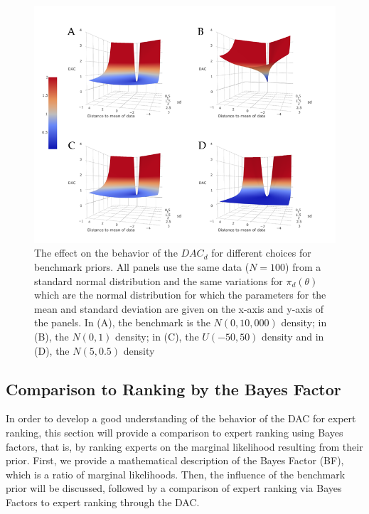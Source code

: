 \documentclass[openright,titlepage,12pt,a4paper]{book}
\begin{document}
\begin{figure}

{\centering \includegraphics[width=0.9\linewidth]{figures/chapter_3/Figure4} 

}

\caption{The effect on the behavior of the $DAC_d$ for different choices for benchmark priors. All panels use the same data ($N = 100$) from a standard normal distribution and the same variations for $\pi_d(\theta)$ which are the normal distribution for which the parameters for the mean and standard deviation are given on the x-axis and y-axis of the panels. In (A), the benchmark is the $N(0, 10,000)$ density; in (B), the $N(0, 1)$ density; in (C), the $U(-50, 50)$ density and in (D), the $N(5, 0.5)$ density}\label{fig:ch03fig4}
\end{figure}

\hypertarget{DACvsBF}{%
\subsection{Comparison to Ranking by the Bayes Factor}\label{DACvsBF}}

In order to develop a good understanding of the behavior of the DAC for expert ranking, this section will provide a comparison to expert ranking using Bayes factors, that is, by ranking experts on the marginal likelihood resulting from their prior. First, we provide a mathematical description of the Bayes Factor (BF), which is a ratio of marginal likelihoods. Then, the influence of the benchmark prior will be discussed, followed by a comparison of expert ranking via Bayes Factors to expert ranking through the DAC.
\end{document}

